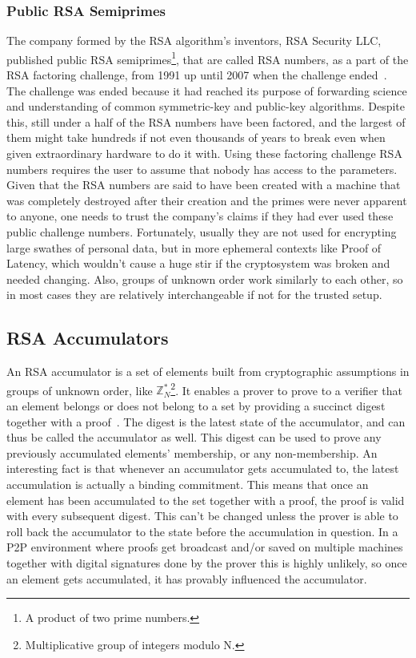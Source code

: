 \subsubsection{Public RSA Semiprimes}
The company formed by the RSA algorithm's inventors, RSA Security LLC, published public RSA semiprimes\footnote{A product of two prime numbers.}, that are called RSA numbers, as a part of the RSA factoring challenge, from 1991 up until 2007 when the challenge ended~\cite{RSA_Laboratories2013-zk}. The challenge was ended because it had reached its purpose of forwarding science and understanding of common symmetric-key and public-key algorithms. Despite this, still under a half of the RSA numbers have been factored, and the largest of them might take hundreds if not even thousands of years to break even when given extraordinary hardware to do it with.
Using these factoring challenge RSA numbers requires the user to assume that nobody has access to the parameters. Given that the RSA numbers are said to have been created with a machine that was completely destroyed after their creation and the primes were never apparent to anyone, one needs to trust the company's claims if they had ever used these public challenge numbers. Fortunately, usually they are not used for encrypting large swathes of personal data, but in more ephemeral contexts like Proof of Latency, which wouldn't cause a huge stir if the cryptosystem was broken and needed changing. Also, groups of unknown order work similarly to each other, so in most cases they are relatively interchangeable if not for the trusted setup.

\subsection{RSA Accumulators}
An RSA accumulator is a set of elements built from cryptographic assumptions in groups of unknown order, like \(\mathbb{Z}^*_N\)\footnote{Multiplicative group of integers modulo N.}. It enables a prover to prove to a verifier that an element belongs or does not belong to a set by providing a succinct digest together with a proof~\cite{Tomescu2020-wq, Konstantopoulos2019-ls}. The digest is the latest state of the accumulator, and can thus be called the accumulator as well. This digest can be used to prove any previously accumulated elements' membership, or any non-membership. An interesting fact is that whenever an accumulator gets accumulated to, the latest accumulation is actually a binding commitment. This means that once an element has been accumulated to the set together with a proof, the proof is valid with every subsequent digest. This can't be changed unless the prover is able to roll back the accumulator to the state before the accumulation in question. In a P2P environment where proofs get broadcast and/or saved on multiple machines together with digital signatures done by the prover this is highly unlikely, so once an element gets accumulated, it has provably influenced the accumulator.

